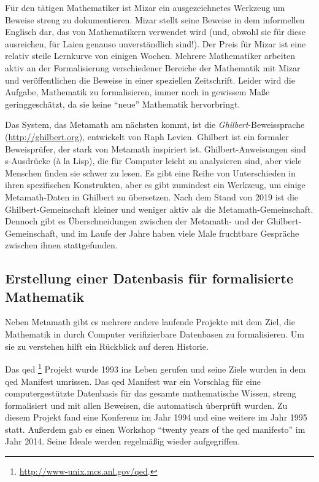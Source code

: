 Für den tätigen Mathematiker ist Mizar ein ausgezeichnetes Werkzeug um Beweise streng zu dokumentieren. Mizar stellt seine Beweise in dem informellen Englisch dar, das von Mathematikern verwendet wird (und, obwohl sie für diese ausreichen, für Laien genauso unverständlich sind!). Der Preis für Mizar ist eine relativ steile Lernkurve von einigen Wochen.  Mehrere Mathematiker arbeiten aktiv an der Formalisierung verschiedener Bereiche der Mathematik mit Mizar und veröffentlichen die Beweise in einer speziellen Zeitschrift. Leider wird die Aufgabe, Mathematik zu formalisieren, immer noch in gewissem Maße geringgeschätzt, da sie keine "`neue"' Mathematik hervorbringt.

Das System, das Metamath am nächsten kommt, ist die {\em Ghilbert}-Beweis\-spra\-che (\url{http://ghilbert.org}), entwickelt von Raph Levien.
Ghilbert ist ein formaler Beweisprüfer, der stark von Metamath inspiriert ist.
Ghilbert-Anweisungen sind s-Ausdrücke (à la Lisp), die für Computer leicht zu analysieren sind, aber viele Menschen finden sie schwer zu lesen.
Es gibt eine Reihe von Unterschieden in ihren spezifischen Konstrukten, aber es gibt zumindest ein Werkzeug, um einige Metamath-Daten in Ghilbert zu übersetzen.
Nach dem Stand von 2019 ist die Ghilbert-Gemeinschaft kleiner und weniger aktiv als die Metamath-Gemeinschaft.
Dennoch gibt es Überschneidungen zwischen der Metamath- und der Ghilbert-Gemeinschaft, und im Laufe der Jahre haben viele Male fruchtbare Gespräche zwischen ihnen  stattgefunden.

\subsection{Erstellung einer Datenbasis für formalisierte\texorpdfstring{\\}{} Mathematik}\label{mathdatabase}

Neben Metamath gibt es mehrere andere laufende Projekte mit dem Ziel, die Mathematik in durch Computer verifizierbare Datenbasen zu formalisieren.  Um sie zu verstehen hilft ein Rückblick auf deren Historie.

Das {\sc qed}%
\footnote{\url{http://www-unix.mcs.anl.gov/qed}.}
Projekt wurde 1993 ins Leben gerufen und seine Ziele wurden in dem {\sc qed} Manifest umrissen.
Das {\sc qed} Manifest war ein Vorschlag für eine computergestützte Datenbasis für das gesamte mathematische Wissen, streng formalisiert und mit allen Beweisen, die automatisch überprüft wurden.
Zu diesem Projekt fand eine Konferenz im Jahr 1994 und eine weitere im Jahr 1995 statt. Außerdem gab es einen Workshop "`twenty years of the {\sc qed} manifesto"' im Jahr 2014.
Seine Ideale werden regelmäßig wieder aufgegriffen.

